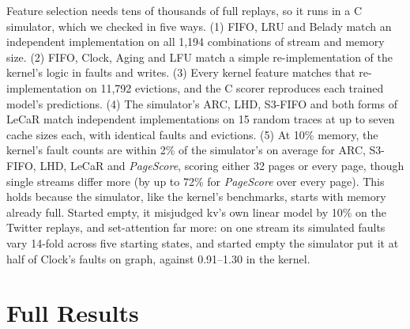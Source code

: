 \documentclass{article}
\newcommand{\figdata}{figures/data}
\newcommand{\clock}{Clock\xspace}
\newcommand{\belady}{Belady\xspace}
\DeclareRobustCommand{\pagescore}{\textit{PageScore}}
\newcommand{\wsixteen}{figures/data/w16}
\begin{document}
Feature selection needs tens of thousands of full replays, so it runs in a C simulator, which we checked in five ways. (1) FIFO, LRU and \belady match an independent implementation on all 1,194 combinations of stream and memory size. (2) FIFO, \clock, Aging and LFU match a simple re-implementation of the kernel's logic in faults and writes. (3) Every kernel feature matches that re-implementation on 11,792 evictions, and the C scorer reproduces each trained model's predictions. (4) The simulator's ARC, LHD, S3-FIFO and both forms of LeCaR match independent implementations on 15 random traces at up to seven cache sizes each, with identical faults and evictions. (5) At 10\% memory, the kernel's fault counts are within 2\% of the simulator's on average for ARC, S3-FIFO, LHD, LeCaR and \pagescore{}, scoring either 32 pages or every page, though single streams differ more (by up to 72\% for \pagescore{} over every page). This holds because the simulator, like the kernel's benchmarks, starts with memory already full. Started empty, it misjudged kv's own linear model by 10\% on the Twitter replays, and set-attention far more: on one stream its simulated faults vary 14-fold across five starting states, and started empty the simulator put it at half of \clock's faults on graph, against 0.91--1.30 in the kernel.

\FloatBarrier
\section{Full Results}
\label{app:results}

\begin{table}[h!]
\caption{Every comparison in the kernel with its 95\% interval: faults of the first policy relative to the second, over all 74 streams (below 1: the first has fewer). Bold: the whole interval is below 0.99. The 16-page score ran only at 10\% memory. Table~\ref{tab:ci} shows the main rows.}
\label{tab:ci-full}
\vskip 0.05in
\begin{center}
\end{center}
\end{table}

\begin{table}[h!]
\caption{Every policy on every workload, in the kernel at 5\% memory: faults relative to \clock, averaged over each workload's streams, with the average over the 14 workloads in the last column (as in Table~\ref{tab:kernel} for 10\%).}
\vskip 0.05in
\begin{center}
\resizebox{\textwidth}{!}{}
\end{center}
\end{table}
\end{document}
